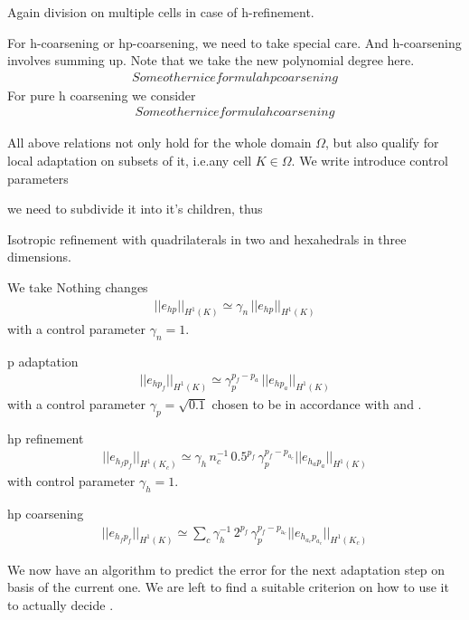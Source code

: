 
Again division on multiple cells in case of h-refinement.

For h-coarsening or hp-coarsening, we need to take special care. And h-coarsening involves summing up. Note that we take the new polynomial degree here.
\begin{align}
Some other nice formula hp coarsening
\end{align}
For pure h coarsening we consider
\begin{align}
Some other nice formula h coarsening
\end{align}


All above relations not only hold for the whole domain $\Omega$, but also qualify for local adaptation on subsets of it, i.e.\@ any cell $K \in \Omega$. We write introduce control parameters

we need to subdivide it into it's children, thus

Isotropic refinement with quadrilaterals in two and hexahedrals in three dimensions.

We take
Nothing changes
\begin{align}
\label{eq:nothing} ||e_{h p}||_{H^1(K)} \simeq \gamma_n \, ||e_{h p}||_{H^1(K)}
\end{align}
with a control parameter \(\gamma_n = 1\).

p adaptation
\begin{align}
\label{eq:p_adaptation} ||e_{h p_f}||_{H^1(K)} \simeq \gamma_p^{p_f-p_a} \, ||e_{h p_a}||_{H^1(K)}
\end{align}
with a control parameter \(\gamma_p = \sqrt{0.1}\) chosen to be in accordance with \cite{melenk2001} and \cite{mitchell2014}.

hp refinement
\begin{align}
\label{eq:hp_refinement} ||e_{h_f p_f}||_{H^1(K_c)} \simeq \gamma_h \, n_c^{-1} \, 0.5^{p_f} \, \gamma_p^{p_f - p_{a_c}} ||e_{h_a p_a}||_{H^1(K)}
\end{align}
with control parameter \(\gamma_h = 1\).

hp coarsening
\begin{align}
\label{eq:hp_coarsening} ||e_{h_f p_f}||_{H^1(K)} \simeq \sum\limits_{c} \gamma_h^{-1} \, 2^{p_f} \, \gamma_p^{p_f - p_{\text{a}_c}} ||e_{h_{a_c} p_{a_c}}||_{H^1(K_c)}
\end{align}


We now have an algorithm to predict the error for the next adaptation step on basis of the current one. We are left to find a suitable criterion on how to use it to actually decide .

